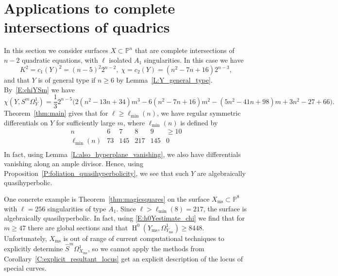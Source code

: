 \documentclass[12pt, reqno]{amsart}
\theoremstyle{definition}
\newcommand{\PP}{{\mathbb P}}
\DeclareMathOperator{\HH}{H}
\newcommand{\Xms}{X_\mathrm{ms}}
\newcommand{\Yms}{Y_\mathrm{ms}}
\numberwithin{equation}{section}
\numberwithin{table}{section}
\begin{document}
\section{Applications to complete intersections of quadrics}
\label{s:QuadricCIs}

In this section we consider surfaces $X\subset \PP^n$ that are complete intersections of $n-2$ quadratic equations, with $\ell$ isolated $A_1$ singularities. In this case we have
\[K^2=c_1(Y)^2=(n-5)^2 2^{n-2},\; \chi=c_2(Y)=(n^2-7n+16)2^{n-3},\]
and that $Y$ is of general type if $n\geq 6$ by Lemma~\ref{L:Y_general_type}. By~\eqref{E:chiYSm} we have
\[\chi(Y,S^m\Omega^1_Y)=\frac{1}{3}2^{n-5}\big(
2(n^2-13n+34)m^3-6(n^2-7n+16)m^2-(5n^2-41n+98)m+3n^2-27+66
\big).\] 
Theorem~\ref{thm:main} gives that for $\ell \geq \ell_{\mathrm{min}}(n)$, we have regular symmetric differentials on $Y$ for sufficiently large $m$, where $\ell_{\mathrm{min}}(n)$ is defined by
\[
\begin{array}{c||c|c|c|c|c}
n&6&7&8&9&\geq 10\\
\hline
\ell_\mathrm{min}(n)&73&145&217&145&0\\
\end{array}\]
 In fact, using Lemma~\ref{L:also_hyperplane_vanishing}, we also have differentials vanishing along an ample divisor. Hence, using Proposition~\ref{P:foliation_quasihyperbolicity}, we see that such $Y$ are algebraically quasihyperbolic.

One concrete example is Theorem~\ref{thm:magicsquares} on the surface $\Xms\subset\PP^8$ with $\ell=256$ singularities of type $A_1$. Since $\ell > \ell_\mathrm{min}(8)=217$, the surface is algebraically quasihyperbolic. In fact, using \eqref{E:h0Yestimate_chi} we find that for $m\geq 47$ there are global sections and that $\HH^0(\Yms,\Omega^1_{\Yms})\geq 8448$. Unfortunately, $\Xms$ is out of range of current computational techniques to explicitly determine $\hat{S}^m\Omega^1_{\Xms}$, so we cannot apply the methods from Corollary~\ref{C:explicit_resultant_locus} get an explicit description of the locus of special curves.
\end{document}
